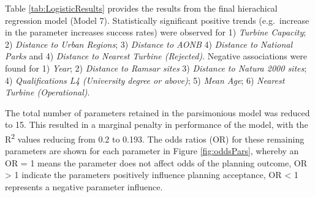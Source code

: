 \documentclass[a4paper,]{article}
\theoremstyle{definition}
\theoremstyle{definition}
\theoremstyle{definition}
\theoremstyle{remark}
\begin{document}
\begin{table}[!h]

\caption{\label{tab:LogisticModelComparison}A summary of the hierarchical logistic regression models}
\centering
{}
\end{table}

Table \ref{tab:LogisticResults} provides the results from the final
hierachical regression model (Model 7). Statistically significant
positive trends (e.g.~increase in the parameter increases success rates)
were observed for 1) \emph{Turbine Capacity}; 2) \emph{Distance to Urban
Regions}; 3) \emph{Distance to AONB} 4) \emph{Distance to National
Parks} and 4) \emph{Distance to Nearest Turbine (Rejected)}. Negative
associations were found for 1) \emph{Year}; 2) \emph{Distance to Ramsar
sites} 3) \emph{Distance to Natura 2000 sites}; 4) \emph{Qualifications
L4 (University degree or above)}; 5) \emph{Mean Age}; 6) \emph{Nearest
Turbine (Operational)}.

The total number of parameters retained in the parsimonious model was
reduced to 15. This resulted in a marginal penalty in performance of the
model, with the R\textsuperscript{2} values reducing from 0.2 to 0.193.
The odds ratios (OR) for these remaining parameters are shown for each
parameter in Figure \ref{fig:oddsPars}, whereby an OR = 1 means the
parameter does not affect odds of the planning outcome, OR
\textgreater{} 1 indicate the parameters positively influence planning
acceptance, OR \textless{} 1 represents a negative parameter influence.
\end{document}
